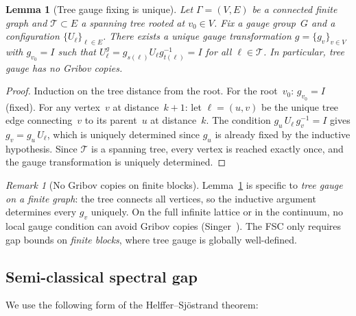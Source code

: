 \documentclass[11pt,a4paper]{article}
\theoremstyle{plain}
\newtheorem{lemma}[theorem]{Lemma}
\theoremstyle{definition}
\theoremstyle{remark}
\newtheorem{remark}[theorem]{Remark}
\begin{document}
\begin{lemma}[Tree gauge fixing is unique]
\label{lem:tree_gauge}
Let $\Gamma = (V, E)$ be a connected finite graph and
$\mathcal{T} \subset E$ a spanning tree rooted at
$v_0 \in V$.  Fix a gauge group~$G$ and a
configuration $\{U_\ell\}_{\ell \in E}$.
There exists a \emph{unique} gauge transformation
$g = \{g_v\}_{v \in V}$ with $g_{v_0} = I$ such that
$U_\ell^g = g_{s(\ell)} U_\ell g_{t(\ell)}^{-1} = I$
for all $\ell \in \mathcal{T}$.
In particular, tree gauge has no Gribov copies.
\end{lemma}

\begin{proof}
Induction on the tree distance from the root.
For the root~$v_0$: $g_{v_0} = I$ (fixed).
For any vertex~$v$ at distance~$k+1$: let $\ell = (u, v)$
be the unique tree edge connecting~$v$ to its parent~$u$
at distance~$k$.  The condition
$g_u\,U_\ell\,g_v^{-1} = I$ gives
$g_v = g_u\,U_\ell$, which is uniquely
determined since $g_u$ is already fixed by the
inductive hypothesis.  Since $\mathcal{T}$ is a spanning
tree, every vertex is reached exactly once, and the
gauge transformation is uniquely determined.
\end{proof}

\begin{remark}[No Gribov copies on finite blocks]
\label{rem:gribov}
Lemma~\ref{lem:tree_gauge} is specific to
\emph{tree gauge on a finite graph}: the tree connects
all vertices, so the inductive argument determines every
$g_v$ uniquely.  On the full infinite lattice or in the
continuum, no local gauge condition can avoid Gribov
copies (Singer~\cite{Singer78}).  The FSC only requires
gap bounds on \emph{finite blocks}, where tree gauge is
globally well-defined.
\end{remark}

\subsection{Semi-classical spectral gap}

We use the following form of the Helffer--Sj\"ostrand theorem:
\end{document}
